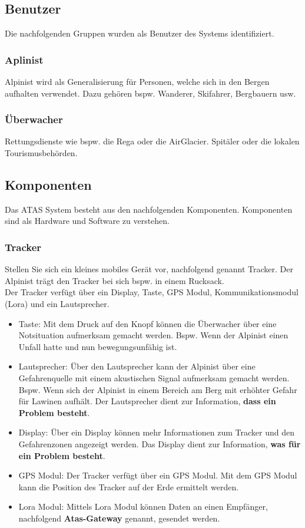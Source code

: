 \documentclass[11pt,english,german]{report}
\theoremstyle{definition}
\begin{document}
\newpage

\subsection{Benutzer}
Die nachfolgenden Gruppen wurden als Benutzer des Systems identifiziert.
\subsubsection{Aplinist}
Alpinist wird als Generalisierung für Personen, welche sich in den Bergen aufhalten verwendet. Dazu gehören bspw. Wanderer, Skifahrer, Bergbauern usw.
\subsubsection{Überwacher}
Rettungsdienste wie bspw. die Rega oder die AirGlacier. Spitäler oder die lokalen Tourismusbehörden.

\subsection{Komponenten}
Das ATAS System besteht aus den nachfolgenden Komponenten. Komponenten sind als Hardware und Software zu verstehen.
\subsubsection{Tracker}
Stellen Sie sich ein kleines mobiles Gerät vor, nachfolgend genannt Tracker. Der Alpinist trägt den Tracker bei sich bspw. in einem Rucksack.\bigskip \\ 
Der Tracker verfügt über ein Display, Taste, GPS Modul, Kommunikationsmodul (Lora) und ein Lautsprecher.
\begin{itemize}
\item
Taste: Mit dem Druck auf den Knopf können die Überwacher über eine Notsituation aufmerksam gemacht werden. Bspw. Wenn der Alpinist einen Unfall hatte und nun bewegungsunfähig ist.
\item
Lautsprecher: Über den Lautsprecher kann der Alpinist über eine Gefahrenquelle mit einem akustischen Signal aufmerksam gemacht werden. Bspw. Wenn sich der Alpinist in einem Bereich am Berg mit erhöhter Gefahr für Lawinen aufhält. Der Lautsprecher dient zur Information, \textbf{dass ein Problem besteht}.
\item
Display: Über ein Display können mehr Informationen zum Tracker und den Gefahrenzonen angezeigt werden. Das Display dient zur Information, \textbf{was für ein Problem besteht}.
\item
GPS Modul: Der Tracker verfügt über ein GPS Modul. Mit dem GPS Modul kann die Position des Tracker auf der Erde ermittelt werden.
\item 
Lora Modul: Mittels Lora Modul können Daten an einen Empfänger, nachfolgend \textbf{Atas-Gateway} genannt, gesendet werden.
\end{itemize}
\end{document}
